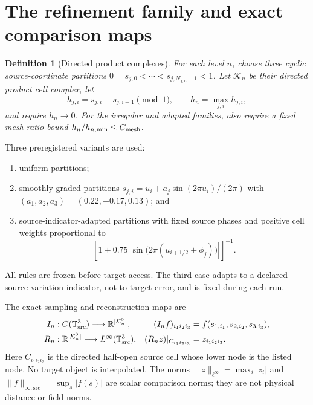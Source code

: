 \documentclass[11pt]{article}
\newcommand{\K}{\mathcal K}
\newcommand{\R}{\mathbb R}
\newcommand{\T}{\mathbb T}
\newtheorem{definition}{Definition}
\begin{document}
\section{The refinement family and exact comparison maps}

\begin{definition}[Directed product complexes]
For each level $n$, choose three cyclic source-coordinate partitions
$0=s_{j,0}<\cdots<s_{j,N_{j,n}-1}<1$.  Let $\K_n$ be their directed product
cell complex, let
\begin{equation}
  h_{j,i}=s_{j,i}-s_{j,i-1}\pmod 1,
  \qquad h_n=\max_{j,i}h_{j,i},
  \label{eq:mesh}
\end{equation}
and require $h_n\to0$.  For the irregular and adapted families, also require
a fixed mesh-ratio bound $h_n/h_{n,\min}\le C_{\rm mesh}$.
\end{definition}

Three preregistered variants are used:
\begin{enumerate}[leftmargin=*]
  \item uniform partitions;
  \item smoothly graded partitions
  $s_{j,i}=u_i+a_j\sin(2\pi u_i)/(2\pi)$ with
  $(a_1,a_2,a_3)=(0.22,-0.17,0.13)$; and
  \item source-indicator-adapted partitions with fixed source phases and
  positive cell weights proportional to
  \begin{equation*}
    \left[1+0.75\left|\sin\bigl(2\pi(u_{i+1/2}+\phi_j)\bigr)\right|\right]^{-1}.
  \end{equation*}
\end{enumerate}
All rules are frozen before target access.  The third case adapts to a declared
source variation indicator, not to target error, and is fixed during each run.

The exact sampling and reconstruction maps are
\begin{align}
  I_n &: C(\T^3_{\rm src})\longrightarrow\R^{|\K_n^0|},
       &(I_nf)_{i_1i_2i_3}&=f(s_{1,i_1},s_{2,i_2},s_{3,i_3}),
       \label{eq:sampling}\\
  R_n &: \R^{|\K_n^0|}\longrightarrow L^\infty(\T^3_{\rm src}),
       &(R_nz)|_{C_{i_1i_2i_3}}&=z_{i_1i_2i_3}.
       \label{eq:reconstruction}
\end{align}
Here $C_{i_1i_2i_3}$ is the directed half-open source cell whose lower node is
the listed node.  No target object is interpolated.  The norms
$\|z\|_{\ell^\infty}=\max_i|z_i|$ and
$\|f\|_{\infty,\mathrm{src}}=\sup_s|f(s)|$ are scalar comparison norms;
they are not physical distance or field norms.
\end{document}

